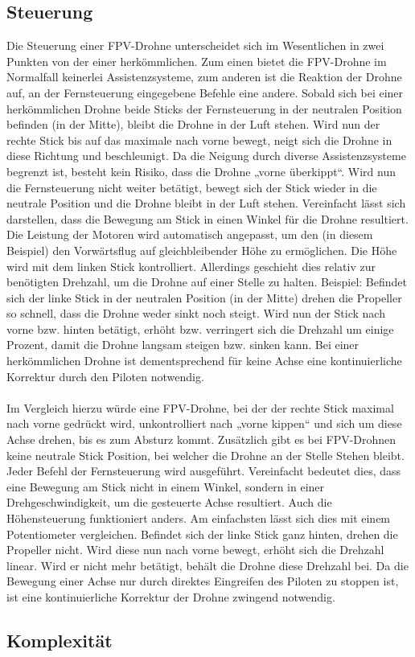 \subsection[Steuerung]{Steuerung}
Die Steuerung einer FPV-Drohne unterscheidet sich im Wesentlichen in zwei Punkten von der einer herkömmlichen. Zum einen bietet die FPV-Drohne im Normalfall keinerlei Assistenzsysteme, zum anderen ist die Reaktion der Drohne auf, an der Fernsteuerung eingegebene Befehle eine andere. Sobald sich bei einer herkömmlichen Drohne beide Sticks der Fernsteuerung in der neutralen Position befinden (in der Mitte), bleibt die Drohne in der Luft stehen. Wird nun der rechte Stick bis auf das maximale nach vorne bewegt, neigt sich die Drohne in diese Richtung und beschleunigt. Da die Neigung durch diverse Assistenzsysteme begrenzt ist, besteht kein Risiko, dass die Drohne „vorne überkippt“. Wird nun die Fernsteuerung nicht weiter betätigt, bewegt sich der Stick wieder in die neutrale Position und die Drohne bleibt in der Luft stehen. Vereinfacht lässt sich darstellen, dass die Bewegung am Stick in einen Winkel für die Drohne resultiert. Die Leistung der Motoren wird automatisch angepasst, um den (in diesem Beispiel) den Vorwärtsflug auf gleichbleibender Höhe zu ermöglichen. Die Höhe wird mit dem linken Stick kontrolliert. Allerdings geschieht dies relativ zur benötigten Drehzahl, um die Drohne auf einer Stelle zu halten. Beispiel: Befindet sich der linke Stick in der neutralen Position (in der Mitte) drehen die Propeller so schnell, dass die Drohne weder sinkt noch steigt. Wird nun der Stick nach vorne bzw. hinten betätigt, erhöht bzw. verringert sich die Drehzahl um einige Prozent, damit die Drohne langsam steigen bzw. sinken kann. Bei einer herkömmlichen Drohne ist dementsprechend für keine Achse eine kontinuierliche Korrektur durch den Piloten notwendig. 
\\ \\
Im Vergleich hierzu würde eine FPV-Drohne, bei der der rechte Stick maximal nach vorne gedrückt wird, unkontrolliert nach „vorne kippen“ und sich um diese Achse drehen, bis es zum Absturz kommt. Zusätzlich gibt es bei FPV-Drohnen keine neutrale Stick Position, bei welcher die Drohne an der Stelle Stehen bleibt. Jeder Befehl der Fernsteuerung wird ausgeführt. Vereinfacht bedeutet dies, dass eine Bewegung am Stick nicht in einem Winkel, sondern in einer Drehgeschwindigkeit, um die gesteuerte Achse resultiert. Auch die Höhensteuerung funktioniert anders. Am einfachsten lässt sich dies mit einem Potentiometer vergleichen. Befindet sich der linke Stick ganz hinten, drehen die Propeller nicht. Wird diese nun nach vorne bewegt, erhöht sich die Drehzahl linear. Wird er nicht mehr betätigt, behält die Drohne diese Drehzahl bei. Da die Bewegung einer Achse nur durch direktes Eingreifen des Piloten zu stoppen ist, ist eine kontinuierliche Korrektur der Drohne zwingend notwendig.
\subsection[Komplexität]{Komplexität}




